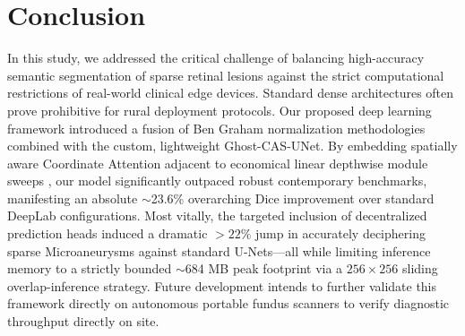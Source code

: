 \section{Conclusion}
In this study, we addressed the critical challenge of balancing high-accuracy semantic segmentation of sparse retinal lesions against the strict computational restrictions of real-world clinical edge devices. Standard dense architectures often prove prohibitive for rural deployment protocols. Our proposed deep learning framework introduced a fusion of Ben Graham normalization \cite{ben_graham_2015} methodologies combined with the custom, lightweight Ghost-CAS-UNet. By embedding spatially aware Coordinate Attention \cite{coord_attn_2021} adjacent to economical linear depthwise module sweeps \cite{ghostnet_2020}, our model significantly outpaced robust contemporary benchmarks, manifesting an absolute $\sim$23.6\% overarching Dice improvement over standard DeepLab configurations. Most vitally, the targeted inclusion of decentralized prediction heads induced a dramatic $>22\%$ jump in accurately deciphering sparse Microaneurysms against standard U-Nets—all while limiting inference memory to a strictly bounded $\sim$684 MB peak footprint via a $256 \times 256$ sliding overlap-inference strategy. Future development intends to further validate this framework directly on autonomous portable fundus scanners to verify diagnostic throughput directly on site.

